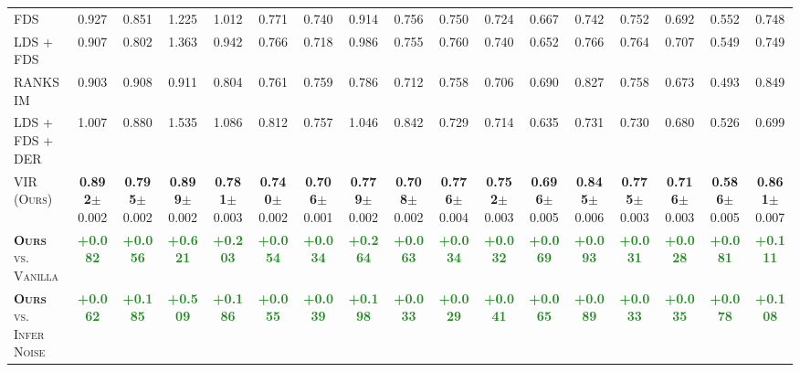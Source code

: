 \begin{table*}[h]
\begin{center}
{\begin{tabular}{l|cccc|cccc|cccc|cccc}
\textsc{FDS}~\citep{DIR} & 0.927 & 0.851 & 1.225 & 1.012 & 0.771 & 0.740 & 0.914 & 0.756 & 0.750 & 0.724 & 0.667 & 0.742 & 0.752 & 0.692 & 0.552 & 0.748 \\[1.5pt]
\textsc{LDS + FDS}~\citep{DIR} & 0.907 & 0.802 & 1.363 & 0.942 & 0.766 & 0.718 & 0.986 & 0.755 & 0.760 & 0.740 & 0.652 & 0.766 & 0.764 & 0.707 & 0.549 & 0.749 \\[1.5pt]
\textsc{RANKSIM}~\citep{RankSim} & 0.903 & 0.908 & 0.911 & 0.804 & 0.761 & 0.759 & 0.786 & 0.712 & 0.758 & 0.706 & 0.690 & 0.827 & 0.758 & 0.673 & 0.493 & 0.849 \\[1.5pt]
\textsc{LDS + FDS + DER}~\citep{DER} & 1.007 & 0.880 & 1.535 & 1.086 & 0.812 & 0.757 & 1.046 & 0.842 & 0.729 & 0.714 & 0.635 & 0.731 & 0.730 & 0.680 & 0.526 & 0.699 \\[1.5pt]
\textsc{VIR (Ours)} & \textbf{0.892}\scriptsize{$\pm$0.002} & \textbf{0.795}\scriptsize{$\pm$0.002} & \textbf{0.899}\scriptsize{$\pm$0.002} & \textbf{0.781}\scriptsize{$\pm$0.003} & \textbf{0.740}\scriptsize{$\pm$0.002} & \textbf{0.706}\scriptsize{$\pm$0.001} & \textbf{0.779}\scriptsize{$\pm$0.002} & \textbf{0.708}\scriptsize{$\pm$0.002} & \textbf{0.776}\scriptsize{$\pm$0.004} & \textbf{0.752}\scriptsize{$\pm$0.003} & \textbf{0.696}\scriptsize{$\pm$0.005} & \textbf{0.845}\scriptsize{$\pm$0.006} & \textbf{0.775}\scriptsize{$\pm$0.003} & \textbf{0.716}\scriptsize{$\pm$0.003} & \textbf{0.586}\scriptsize{$\pm$0.005} & \textbf{0.861}\scriptsize{$\pm$0.007} \\[1.5pt] \midrule\midrule
\textsc{\textbf{Ours} vs. Vanilla} & \textcolor{ForestGreen}{\textbf{+0.082}} & \textcolor{ForestGreen}{\textbf{+0.056}} & \textcolor{ForestGreen}{\textbf{+0.621}} & \textcolor{ForestGreen}{\textbf{+0.203}} & \textcolor{ForestGreen}{\textbf{+0.054}} & \textcolor{ForestGreen}{\textbf{+0.034}} & \textcolor{ForestGreen}{\textbf{+0.264}} & \textcolor{ForestGreen}{\textbf{+0.063}} & \textcolor{ForestGreen}{\textbf{+0.034}} & \textcolor{ForestGreen}{\textbf{+0.032}} & \textcolor{ForestGreen}{\textbf{+0.069}} & \textcolor{ForestGreen}{\textbf{+0.093}} & \textcolor{ForestGreen}{\textbf{+0.031}} & \textcolor{ForestGreen}{\textbf{+0.028}} & \textcolor{ForestGreen}{\textbf{+0.081}} & \textcolor{ForestGreen}{\textbf{+0.111}}  \\[1.5pt]
\textsc{\textbf{Ours} vs. Infer Noise} & \textcolor{ForestGreen}{\textbf{+0.062}} & \textcolor{ForestGreen}{\textbf{+0.185}} & \textcolor{ForestGreen}{\textbf{+0.509}} & \textcolor{ForestGreen}{\textbf{+0.186}} & \textcolor{ForestGreen}{\textbf{+0.055}} & \textcolor{ForestGreen}{\textbf{+0.039}} & \textcolor{ForestGreen}{\textbf{+0.198}} & \textcolor{ForestGreen}{\textbf{+0.033}} & \textcolor{ForestGreen}{\textbf{+0.029}} & \textcolor{ForestGreen}{\textbf{+0.041}} & \textcolor{ForestGreen}{\textbf{+0.065}} & \textcolor{ForestGreen}{\textbf{+0.089}} & \textcolor{ForestGreen}{\textbf{+0.033}} & \textcolor{ForestGreen}{\textbf{+0.035}} & \textcolor{ForestGreen}{\textbf{+0.078}} & \textcolor{ForestGreen}{\textbf{+0.108}} \\[1.5pt]

\end{tabular}}
\end{center}
\end{table*}
